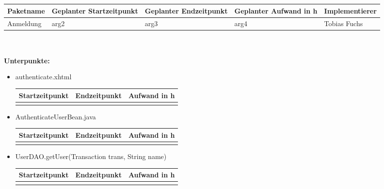\documentclass[12pt,a4paper]{scrreprt}
\newcommand{\Arbeitspaket}[5]{	\begin{tabular}{|p{4cm}|p{3cm}|p{3cm}|p{3cm}|p{3cm}|}
		\hline \textbf{Paketname} & \textbf{Geplanter Startzeitpunkt} & \textbf{Geplanter Endzeitpunkt} & \textbf{Geplanter Aufwand in h} & \textbf{Implementierer} \\ 
		\hline #1 & #2  & #3 & #4 & #5 \\ 
		\hline 
	\end{tabular} \ \\
	\ \\}
\begin{document}
	\ \\
	\ \\
	\Arbeitspaket{Anmeldung}{arg2}{arg3}{arg4}{Tobias Fuchs}
	\textbf{Unterpunkte:}
	\begin{itemize}
		\item authenticate.xhtml\\
		\begin{tabular}{|p{4cm}|p{4cm}|p{4cm}|}
			\hline Startzeitpunkt & Endzeitpunkt & Aufwand in h \\ 
			\hline &      &  \\ 
			\hline 
		\end{tabular}
		\item AuthenticateUserBean.java	\\
		\begin{tabular}{|p{4cm}|p{4cm}|p{4cm}|}
			\hline Startzeitpunkt & Endzeitpunkt & Aufwand in h \\ 
			\hline &      &  \\ 
			\hline 
		\end{tabular}
		\item UserDAO.getUser(Transaction trans, String name)\\
		\begin{tabular}{|p{4cm}|p{4cm}|p{4cm}|}
			\hline Startzeitpunkt & Endzeitpunkt & Aufwand in h \\ 
			\hline &      &  \\ 
			\hline 
		\end{tabular}
	\end{itemize}
	
\end{document}
